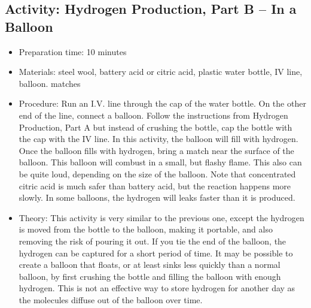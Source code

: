 \begin{itemize}
{\begin{itemize}
\begin{itemize}
{\subsection{Activity: Hydrogen Production, Part B – In a Balloon}
\begin{itemize}
\item{Preparation time: 10 minutes}
\item{Materials: steel wool, battery acid or citric acid, plastic water bottle, IV line, balloon. matches}
\item{Procedure: Run an I.V. line through the cap of the water bottle. On the other end of the line, connect a balloon. Follow the instructions from Hydrogen Production, Part A but instead of crushing the bottle, cap the bottle with the cap with the IV line. In this activity, the balloon will fill with hydrogen. Once the balloon fills with hydrogen, bring a match near the surface of the balloon. This balloon will combust in a small, but flashy flame. This also can be quite loud, depending on the size of the balloon. Note that concentrated citric acid is much safer than battery acid, but the reaction happens more slowly. In some balloons, the hydrogen will leaks faster than it is produced.}
\item{Theory: This activity is very similar to the previous one, except the hydrogen is moved from the bottle to the balloon, making it portable, and also removing the risk of pouring it out. If you tie the end of the balloon, the hydrogen can be captured for a short period of time. It may be possible to create a balloon that floats, or at least sinks less quickly than a normal balloon, by first crushing the bottle and filling the balloon with enough hydrogen. This is not an effective way to store hydrogen for another day as the molecules diffuse out of the balloon over time.}
\end{itemize}

}
\end{itemize}
\end{itemize}}
\end{itemize}
